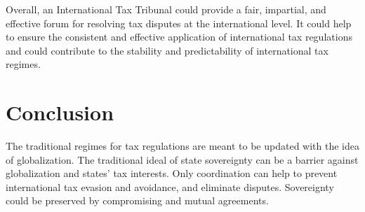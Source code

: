 Overall, an International Tax Tribunal could provide a fair, impartial, and effective forum for resolving tax disputes at the international level. It could help to ensure the consistent and effective application of international tax regulations and could contribute to the stability and predictability of international tax regimes.






\section{Conclusion} 



The traditional regimes for tax regulations are meant to be updated with the idea of globalization. The traditional ideal of state sovereignty can be a barrier against globalization and states' tax interests.
Only coordination can help to prevent international tax evasion and avoidance, and eliminate disputes. Sovereignty could be preserved by compromising and mutual agreements. 


